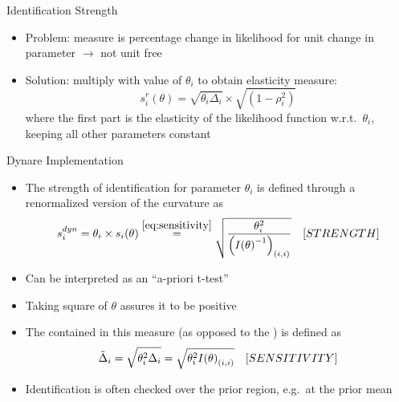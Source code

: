 \begin{frame}{Identification Strength}
\begin{itemize}
    \item Problem: measure is percentage change in likelihood for unit change in parameter $\rightarrow$ not unit free
    \item Solution: multiply with value of $\theta_i$ to obtain elasticity measure:
    \begin{equation}
    s_i^r\left( \theta  \right) = \sqrt {{\theta _i}{\Delta _i}}  \times \sqrt {\left( {1 - \rho _i^2} \right)}
    \end{equation}
    where the first part is the elasticity of the likelihood function w.r.t.\ $\theta_i$, keeping all other parameters constant
\end{itemize}
\end{frame}

\renewcommand{\Source}{\textcite{RattoIskrev2011}}

\begin{frame}{Dynare Implementation}
\begin{itemize}
    \item The strength of identification for parameter $\theta_i$ is defined through a renormalized version of the curvature as
    \begin{equation}
    {s_i^{dyn}} = \theta _i \times s_i(\theta)\overset{\eqref{eq:sensitivity}}{=}\sqrt {\frac{{\theta _i^2}}{{{{\left( {I{{\left( \theta  \right)}^{ - 1}}} \right)}_{\left( {i,i} \right)}}}}} \quad \text[STRENGTH]
    \end{equation}
    \item Can be interpreted as an ``a-priori t-test''
    \item Taking square of $\theta$ assures it to be positive
    \item The  contained in this measure (as opposed to the ) is defined as
    \begin{equation}
    {\tilde\Delta _i} =\sqrt {{\theta _i^2}{\Delta _i}}= \sqrt {\theta _i^2I{{\left( \theta  \right)}_{\left( {i,i} \right)}}} \quad \text[SENSITIVITY]
    \end{equation}
    \item Identification is often checked over the prior region, e.g.\ at the prior mean
\end{itemize}
\end{frame}

